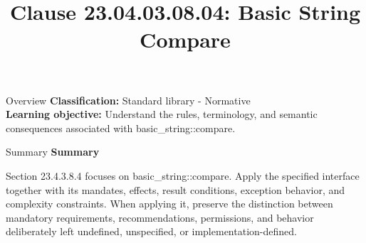 \documentclass[10pt,letterpaper]{article}
\title{Clause 23.04.03.08.04: Basic String Compare}
\author{}
\date{}
\begin{document}
\maketitle
\begin{CornellOverviewBox}{Overview}
\textbf{Classification:} Standard library - Normative\\[2pt]
\textbf{Learning objective:} Understand the rules, terminology, and semantic consequences associated with basic\_string::compare.
\end{CornellOverviewBox}\begin{CornellSummaryBox}{Summary}
{\sffamily\bfseries\color{Accent} Summary}\par\vspace{3pt}Section 23.4.3.8.4 focuses on basic\_string::compare. Apply the specified interface together with its mandates, effects, result conditions, exception behavior, and complexity constraints. When applying it, preserve the distinction between mandatory requirements, recommendations, permissions, and behavior deliberately left undefined, unspecified, or implementation-defined.
\end{CornellSummaryBox}
\end{document}
